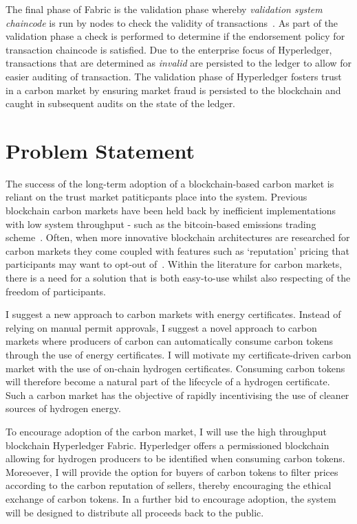 The final phase of Fabric is the validation phase whereby
\textit{validation system chaincode} is run by nodes to check the
validity of transactions~\cite{And18}. As part of the
validation phase a check is
performed to determine if the endorsement policy for transaction
chaincode is satisfied.
Due to the enterprise focus of Hyperledger, transactions that
are determined as \textit{invalid} are persisted to the ledger to allow
for easier auditing of transaction. The validation phase of Hyperledger
fosters trust in a carbon market by ensuring market fraud is persisted to the
blockchain and caught in subsequent audits on the state of the ledger.

\section{Problem Statement}

The success of the long-term adoption of a blockchain-based carbon
market is reliant on the trust market patiticpants place into the
system. Previous blockchain carbon markets have been held back by
inefficient implementations with low system throughput - such as
the bitcoin-based emissions trading scheme~\cite{vic15}. Often, when
more innovative blockchain architectures are researched for carbon markets
they come coupled with features such as `reputation' pricing that
participants may want to opt-out of~\cite{KHAQQI20188}. Within the
literature for carbon markets, there is a need for a solution that is
both easy-to-use whilst also respecting of the freedom of participants.

I suggest a new approach to carbon markets with energy certificates.
Instead of relying on manual permit approvals, I suggest a novel approach
to carbon markets where producers of carbon can automatically consume
carbon tokens through the use of energy certificates. I will motivate
my certificate-driven carbon market with the use of on-chain
hydrogen certificates. Consuming carbon tokens will therefore become
a natural part of the lifecycle of a hydrogen certificate. Such a
carbon market has the objective of rapidly incentivising the use of
cleaner sources of hydrogen energy.

To encourage adoption of the carbon market, I will use the high throughput
blockchain Hyperledger Fabric. Hyperledger offers a permissioned
blockchain allowing for hydrogen producers to be identified when consuming
carbon tokens. Moreoever, I will provide the option for buyers of
carbon tokens to filter prices according to the carbon reputation of
sellers, thereby encouraging the ethical exchange of carbon tokens.
In a further bid to encourage adoption, the system will be designed to
distribute all proceeds back to the public.

